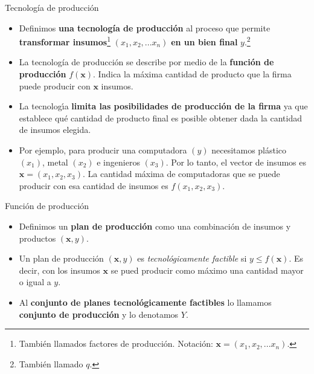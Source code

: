 \documentclass{beamer}
\theoremstyle{definition}
\begin{document}
\begin{frame}{Tecnología de producción}
	\begin{itemize}

		\item Definimos \textbf{una tecnología de producción} al proceso que permite \textbf{transformar insumos}\footnote{También llamados factores de producción. Notación: $\textbf{x}=(x_{1},x_{2},...x_{n})$.} $(x_{1},x_{2},...x_{n})$ \textbf{en un bien final} $y$.\footnote{También llamado $q$.}


   \item La tecnología de producción se describe por medio de la \textbf{función de producción} $f(\textbf{x})$. Indica la máxima cantidad de producto que la firma puede producir con $\textbf{x}$ insumos.
   
		\item La tecnolog\'{\i}a \textbf{limita las posibilidades de producci\'{o}n de la firma} ya que establece qu\'{e} cantidad de producto final es posible obtener dada la cantidad de insumos elegida.

		\item Por ejemplo, para producir una computadora $(y)$ necesitamos plástico $(x_{1})$, metal $(x_{2})$ e ingenieros $(x_{3})$. Por lo tanto, el vector de insumos es $\textbf{x}=(x_1,x_2,x_3)$. La cantidad máxima de computadoras que se puede producir con esa cantidad de insumos es $f(x_1,x_2,x_3)$.
  
		
	\end{itemize}
\end{frame}


\begin{frame}{Función de producción}
	\begin{itemize}
		\item Definimos un \textbf{plan de producción} como una combinación de insumos y productos $(\textbf{x},y)$.
		\item Un plan de producción $(\textbf{x},y)$ es \textit{tecnológicamente factible} si $y \leq f(\textbf{x})$. Es decir, con los insumos $\textbf{x}$ se pued producir como máximo una cantidad mayor o igual a $y$.
  
		\item Al \textbf{conjunto de planes tecnológicamente factibles} lo llamamos \textbf{conjunto de producción} y lo denotamos $Y$.
		
	\end{itemize}
\end{frame}
\end{document}
